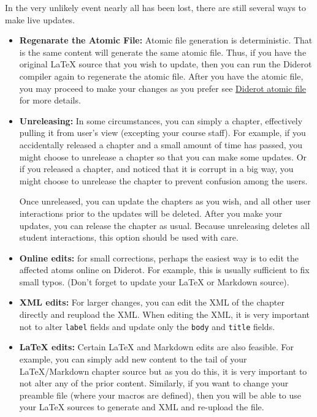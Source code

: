 \begin{note}
\begin{gram}
In the very unlikely event nearly all has been lost, there are still several ways to make live updates.

\begin{itemize}
\item \textbf{Regenarate the Atomic File:} Atomic file generation is
  deterministic.  That is the same content will generate the same
  atomic file.  Thus, if you have the original LaTeX source that you wish to
  update, then you can run the Diderot compiler again to regenerate the atomic file.
  After you have the atomic file, you may proceed to make your changes
  as you prefer see
%
 \href{grm:publisg::diderot-atomic}{Diderot atomic  file} 
%
for more details.
%

\item \textbf{Unreleasing:}
In some circumstances, you can simply  a chapter, effectively pulling it from user's view (excepting your course staff).
%
For example,
if you accidentally released a chapter and a small amount of time has passed, you might choose to unrelease a chapter so that you can make some updates.
%
Or if you released a chapter, and noticed that it is corrupt in a big way, you might choose to unrelease the chapter to prevent confusion among the users.
%

Once unreleased, you can update the chapters as you wish, and all other user interactions  prior to the updates will be deleted.
%
After you make your updates, you can release the chapter as usual.
%
Because unreleasing deletes all student interactions, this option should be used with care.

\item \textbf{Online edits:}
for small corrections, perhaps the easiest way is to edit the affected atoms online on Diderot.  For example, this is usually sufficient to fix small typos.  (Don't forget to update your LaTeX or Markdown source).

\item \textbf{XML edits:}
%
For larger changes, you can edit the XML of the chapter directly and
reupload the XML.  When editing the XML, it is very important not to
alter \lstinline`label` fields and update only the \lstinline`body` and \lstinline`title` fields.

\item \textbf{LaTeX edits:}
Certain LaTeX and Markdown edits are also feasible. 
%
For example, you can simply add new content to the tail of your LaTeX/Markdown chapter source but as you do this, it is very important to not alter any of the prior content. 
%
Similarly, if you want to change your preamble file (where your macros are defined), then you will be able to use your LaTeX sources to generate and XML and re-upload the file. 


\end{itemize}
\end{gram}
\end{note}
